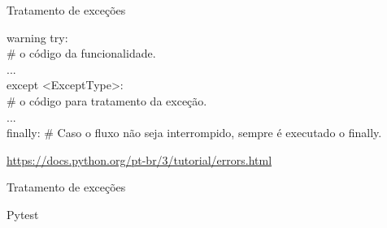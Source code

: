 \begin{frame}[t]{Tratamento de exceções}
	
	\vspace{1em}
	
	\fontsize{13pt}{15}\selectfont{
		A sintaxe básica é:		
	}\par
	
	\vspace{1em}
	\begin{beamercolorbox}[wd=\textwidth]{warning}
		try: \\
		\hspace{1em}{Instruções} \# o código da funcionalidade.\\
		...\\
		except <ExceptType>:\\
		\hspace{1em}{Instruções} \# o código para tratamento da exceção.\\
		...\\
		finally: \# Caso o fluxo não seja interrompido, sempre é executado o finally.\\
		\hspace{1em}{Instruções}
	\end{beamercolorbox}
	
	
	\vspace{2em}
	\url{https://docs.python.org/pt-br/3/tutorial/errors.html}
	
\end{frame}














\begin{frame}[t]{Tratamento de exceções}	
	
	
	
	
\end{frame}





\begin{frame}[t]{Pytest}
	
	
	
	
\end{frame}


